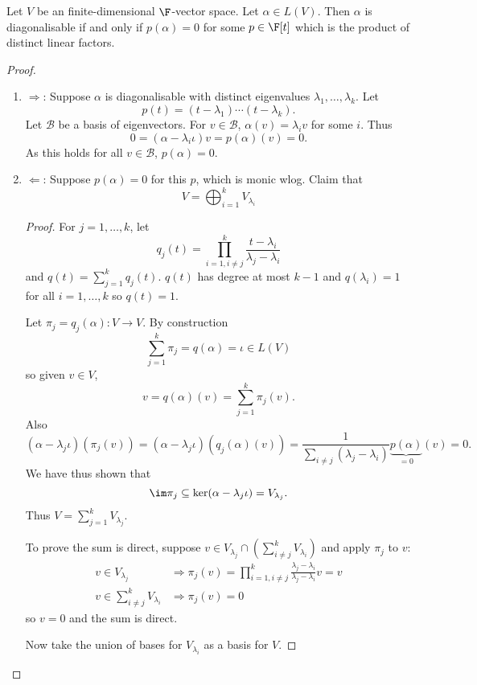 \documentclass[a4paper]{article}
\newcommand*{\basis}{\mathcal}
\theoremstyle{definition}
\begin{document}
\begin{theorem}
  Let \(V\) be an finite-dimensional \(\F\)-vector space. Let \(\alpha \in L(V)\). Then \(\alpha\) is diagonalisable if and only if \(p(\alpha) = 0\) for some \(p \in \F[t]\) which is the product of distinct linear factors.
\end{theorem}

\begin{proof}\leavevmode
  \begin{enumerate}
  \item \(\Rightarrow\): Suppose \(\alpha\) is diagonalisable with distinct eigenvalues \(\lambda_1, \dots, \lambda_k\). Let
    \[
      p(t) = (t - \lambda_1) \cdots (t - \lambda_k).
    \]
    Let \(\basis B\) be a basis of eigenvectors. For \(v \in \basis B\), \(\alpha(v) = \lambda_i v\) for some \(i\). Thus
    \[
      0 = (\alpha - \lambda_i \iota) v = p(\alpha)(v) = 0.
    \]
    As this holds for all \(v \in \basis B\), \(p(\alpha) = 0\).
  \item \(\Leftarrow\): Suppose \(p(\alpha) = 0\) for this \(p\), which is monic wlog. Claim that
    \[
      V = \bigoplus_{i = 1}^k V_{\lambda_i}
    \]
    \begin{proof}
      For \(j = 1, \dots, k\), let
      \[
        q_j(t) = \prod_{i = 1, i \neq j}^k \frac{t - \lambda_i}{\lambda_j - \lambda_i}
      \]
      and \(q(t) = \sum_{j = 1}^k q_j(t)\). \(q(t)\) has degree at most \(k - 1\) and \(q(\lambda_i) = 1\) for all \(i = 1, \dots, k\) so \(q(t) = 1\).

      Let \(\pi_j = q_j(\alpha): V \to V\). By construction
      \[
        \sum_{j = 1}^{k} \pi_j = q(\alpha) = \iota \in L(V)
      \]
      so given \(v \in V\),
      \[
        v = q(\alpha) (v) = \sum_{j = 1}^{k} \pi_j(v).
      \]
      Also
      \[
        (\alpha - \lambda_j \iota)(\pi_j(v)) = (\alpha - \lambda_j\iota)(q_j(\alpha)(v)) = \frac{1}{\sum_{i \neq j}^{ } (\lambda_j - \lambda_i)} \underbrace{p(\alpha)}_{= 0}(v) = 0.
      \]
      We have thus shown that
      \[
        \im \pi_j \subseteq \ker(\alpha - \lambda_j \iota) = V_{\lambda_j}.
      \]
      Thus \(V = \sum_{j = 1}^{k} V_{\lambda_j}\).

      To prove the sum is direct, suppose \(v \in V_{\lambda_j} \cap (\sum_{i \neq j}^k V_{\lambda_i})\) and apply \(\pi_j\) to \(v\):
      \begin{align*}
        v \in V_{\lambda_j} &\Rightarrow \pi_j(v) = \prod_{i = 1, i \neq j}^{k} \frac{\lambda_j - \lambda_i}{\lambda_j - \lambda_i} v = v \\
        v \in \sum_{i \neq j}^{k}V_{\lambda_i} &\Rightarrow \pi_j(v) = 0
      \end{align*}
        so \(v = 0\) and the sum is direct.

        Now take the union of bases for \(V_{\lambda_i}\) as a basis for \(V\).
    \end{proof}
  \end{enumerate}
\end{proof}
\end{document}

